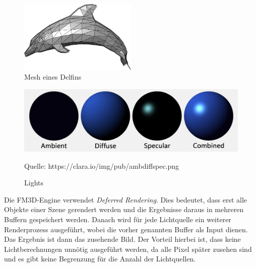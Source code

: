 \begin{figure}
	\begin{center}
		\includegraphics[width=0.5\textwidth]{06anhang/bilder/delphin.jpg}
		\caption{Mesh eines Delfins}
		\label{Dolphin}
	\end{center}
\end{figure}
\begin{figure}
	\centering
	\includegraphics[scale=0.4]{02theorie/amb_diff_spec.png}
		
	Quelle: https://clara.io/img/pub/amb\textunderscore diff\textunderscore spec.png
	\caption{Lights}\label{Img:Lights}
\end{figure}

Die FM3D-Engine verwendet \textit{Deferred Rendering}. Dies bedeutet, dass erst alle Objekte einer Szene gerendert werden und die Ergebnisse daraus in mehreren Buffern gespeichert werden. Danach wird für jede Lichtquelle ein weiterer Renderprozess ausgeführt, wobei die vorher genannten Buffer als Input dienen. Das Ergebnis ist dann das zusehende Bild. Der Vorteil hierbei ist, dass keine Lichtberechnungen unnötig ausgeführt werden, da alle Pixel später zusehen sind und es gibt keine Begrenzung für die Anzahl der Lichtquellen. 